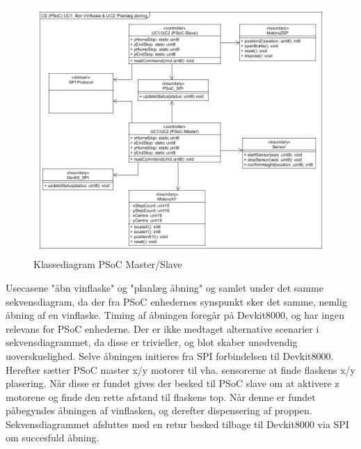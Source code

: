 \begin{figure}[H]
\includegraphics[scale=0.4]{tex/Arkitektur/Fotos/SW/Klassediagram_PSoC}
\caption{Klassediagram PSoC Master/Slave}
\end{figure}

Usecasene "åbn vinflaske" og "planlæg åbning" og samlet under det samme sekvensdiagram, da der fra PSoC enhedernes synspunkt sker det samme, nemlig 
åbning af en vinflaske. Timing af åbningen foregår på Devkit8000, og har ingen relevans for PSoC enhederne. Der er ikke medtaget alternative scenarier i 
sekvensdiagrammet, da disse er trivieller, og blot skaber unødvendig uoverskuelighed. Selve åbningen initieres fra SPI forbindelsen til Devkit8000. Herefter
sætter PSoC master x/y motorer til vha. sensorerne at finde flaskens x/y plasering. Når disse er fundet gives der besked til PSoC slave om at aktivere z motorene
og finde den rette afstand til flaskens top. Når denne er fundet påbegyndes åbningen af vinflasken, og derefter dispensering af proppen. Sekvensdiagrammet
afsluttes med en retur besked tilbage til Devkit8000 via SPI om succesfuld åbning.\\

